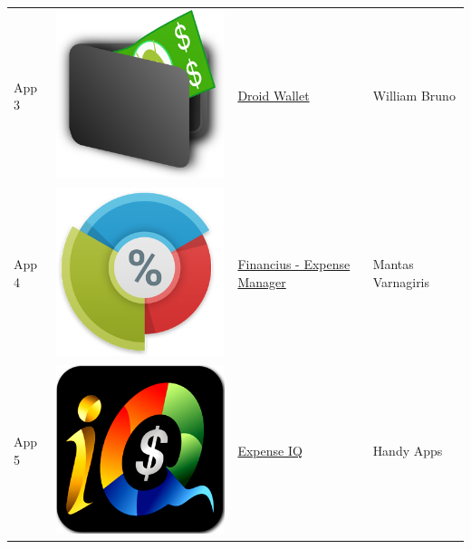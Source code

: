 \begin{table}
\begin{tabular}{ | l | c | l | l | }
App 3 & \includegraphics[scale=0.05]{A03_icon.png} & \href{https://play.google.com/store/apps/details?id=com.bruno.myapps.droidwallet}{Droid Wallet} & William Bruno \\

App 4 & \includegraphics[scale=0.05]{A04_icon.png} & \href{https://play.google.com/store/apps/details?id=com.code44.finance}{Financius - Expense Manager} & Mantas Varnagiris \\

App 5 & \includegraphics[scale=0.05]{A05_icon.png} & \href{https://play.google.com/store/apps/details?id=com.handyapps.expenseiq}{Expense IQ} & Handy Apps \\


\end{tabular}
\end{table}
